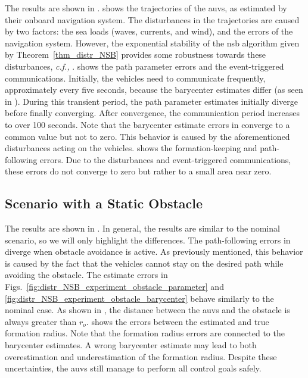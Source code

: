 The results are shown in .
 shows the trajectories of the \glspl{auv}, as estimated by their onboard navigation system.
The disturbances in the trajectories are caused by two factors: the sea loads (waves, currents, and wind), and the errors of the navigation system.
However, the exponential stability of the \gls{nsb} algorithm given by Theorem~\ref{thm_distr_NSB} provides some robustness towards these disturbances, \emph{c.f.,} \cite[Lemma 9.2]{khalil_nonlinear_2002}.
 shows the path parameter errors and the event-triggered communications.
Initially, the vehicles need to communicate frequently, approximately every five seconds, because the barycenter estimates differ (as seen in ).
During this transient period, the path parameter estimates initially diverge before finally converging.
After convergence, the communication period increases to over 100 seconds.
Note that the barycenter estimate errors in  converge to a common value but not to zero.
This behavior is caused by the aforementioned disturbances acting on the vehicles.
 shows the formation-keeping and path-following errors.
Due to the disturbances and event-triggered communications, these errors do not converge to zero but rather to a small area near zero.

\subsection{Scenario with a Static Obstacle}


The results are shown in .
In general, the results are similar to the nominal scenario, so we will only highlight the differences.
The path-following errors in  diverge when obstacle avoidance is active.
As previously mentioned, this behavior is caused by the fact that the vehicles cannot stay on the desired path while avoiding the obstacle.
The estimate errors in Figs.~\ref{fig:distr_NSB_experiment_obstacle_parameter} and \ref{fig:distr_NSB_experiment_obstacle_barycenter} behave similarly to the nominal case.
As shown in , the distance between the \glspl{auv} and the obstacle is always greater than $r_o$.
 shows the errors between the estimated and true formation radius.
Note that the formation radius errors are connected to the barycenter estimates.
A wrong barycenter estimate may lead to both overestimation and underestimation of the formation radius.
Despite these uncertainties, the \glspl{auv} still manage to perform all control goals safely.

